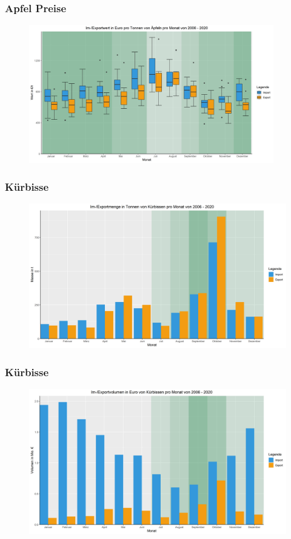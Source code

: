 \documentclass{beamer}
\begin{document}
\begin{frame}
\frametitle{Apfel Preise}
  \begin{figure}[h]
    \centering
    \includegraphics[height=6cm]{4_apfel_preis}
  \end{figure}
\end{frame}

\begin{frame}
	\frametitle{Kürbisse}
	\begin{figure}[b]
		\centering
		\includegraphics[scale=0.35]{Kuerbissen_monthly_weight_Im-Export}
	\end{figure}
\end{frame}

\begin{frame}
	\frametitle{Kürbisse}
	\begin{figure}[b]
		\centering
		\includegraphics[scale=0.35]{Kuerbissen_monthly_Euro_Im-Export}
	\end{figure}
\end{frame}
\end{document}
